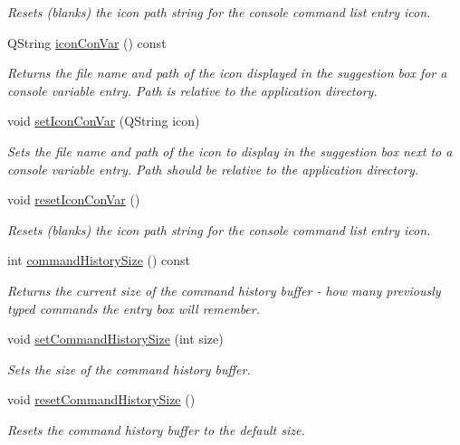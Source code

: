 \begin{DoxyCompactItemize}
\begin{DoxyCompactList}\small\item\em Resets (blanks) the icon path string for the console command list entry icon. \end{DoxyCompactList}\item 
Q\-String \hyperlink{class_command_entry_box_ac7147c8f991326bcf6339d60220a4f58}{icon\-Con\-Var} () const 
\begin{DoxyCompactList}\small\item\em Returns the file name and path of the icon displayed in the suggestion box for a console variable entry. Path is relative to the application directory. \end{DoxyCompactList}\item 
void \hyperlink{class_command_entry_box_a9e4387c47cb2de50da44360110d9e59a}{set\-Icon\-Con\-Var} (Q\-String icon)
\begin{DoxyCompactList}\small\item\em Sets the file name and path of the icon to display in the suggestion box next to a console variable entry. Path should be relative to the application directory. \end{DoxyCompactList}\item 
\hypertarget{class_command_entry_box_a85705eaae1055472de96c07142cf56af}{void \hyperlink{class_command_entry_box_a85705eaae1055472de96c07142cf56af}{reset\-Icon\-Con\-Var} ()}\label{class_command_entry_box_a85705eaae1055472de96c07142cf56af}

\begin{DoxyCompactList}\small\item\em Resets (blanks) the icon path string for the console command list entry icon. \end{DoxyCompactList}\item 
int \hyperlink{class_command_entry_box_a1c7d6384d3009e3685fb45f238c8a279}{command\-History\-Size} () const 
\begin{DoxyCompactList}\small\item\em Returns the current size of the command history buffer -\/ how many previously typed commands the entry box will remember. \end{DoxyCompactList}\item 
void \hyperlink{class_command_entry_box_a96513e1f106fbf5e734c6a4ff7a26e2d}{set\-Command\-History\-Size} (int size)
\begin{DoxyCompactList}\small\item\em Sets the size of the command history buffer. \end{DoxyCompactList}\item 
void \hyperlink{class_command_entry_box_ad81eaeb870ed56bc231cd962d527b520}{reset\-Command\-History\-Size} ()
\begin{DoxyCompactList}\small\item\em Resets the command history buffer to the default size. \end{DoxyCompactList}\end{DoxyCompactItemize}
